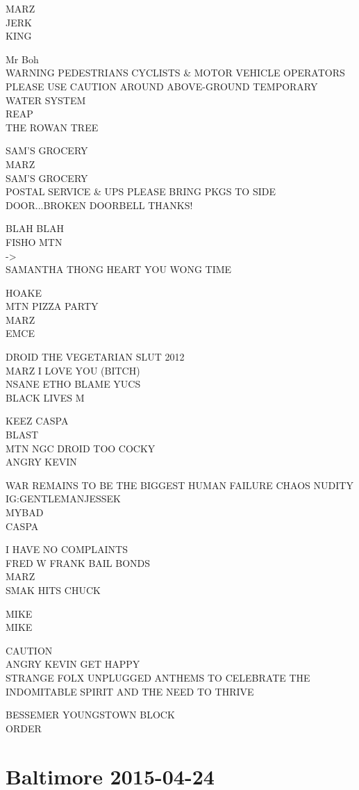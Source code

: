 \documentclass[10pt,letterpaper]{article}
\begin{document}
MARZ\\
JERK\\
KING

Mr Boh\\
WARNING PEDESTRIANS CYCLISTS \& MOTOR VEHICLE OPERATORS PLEASE USE CAUTION AROUND ABOVE{-}GROUND TEMPORARY WATER SYSTEM\\
REAP\\
THE ROWAN TREE

SAM'S GROCERY\\
MARZ\\
SAM'S GROCERY\\
POSTAL SERVICE \& UPS PLEASE BRING PKGS TO SIDE DOOR...BROKEN DOORBELL THANKS!

BLAH BLAH\\
FISHO MTN\\
{-}>\\
SAMANTHA THONG HEART YOU WONG TIME

HOAKE\\
MTN PIZZA PARTY\\
MARZ\\
EMCE

DROID THE VEGETARIAN SLUT 2012\\
MARZ I LOVE YOU (BITCH)\\
NSANE ETHO BLAME YUCS\\
BLACK LIVES M

KEEZ CASPA\\
BLAST\\
MTN NGC DROID TOO COCKY\\
ANGRY KEVIN

WAR REMAINS TO BE THE BIGGEST HUMAN FAILURE CHAOS NUDITY\\
IG:GENTLEMANJESSEK\\
MYBAD\\
CASPA

I HAVE NO COMPLAINTS\\
FRED W FRANK BAIL BONDS\\
MARZ\\
SMAK HITS CHUCK

MIKE\\
MIKE

CAUTION\\
ANGRY KEVIN GET HAPPY\\
STRANGE FOLX UNPLUGGED ANTHEMS TO CELEBRATE THE INDOMITABLE SPIRIT AND THE NEED TO THRIVE

BESSEMER YOUNGSTOWN BLOCK\\
ORDER


\section*{Baltimore 2015-04-24}
\end{document}
